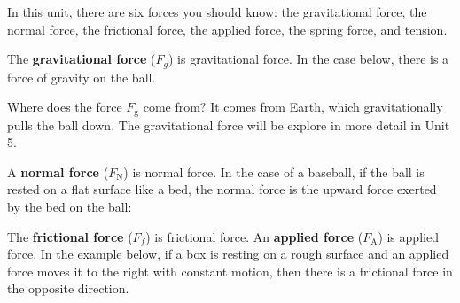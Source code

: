 \documentclass[dvipsnames]{article}
\begin{document}
\begin{center}
\end{center}

In this unit, there are six forces you should know: the gravitational force, the normal force, the frictional force, the applied force, the spring force, and tension.


The \textbf{\gls{gravitational force}} ($F_g$) is \glsdesc{gravitational force}. In the case below, there is a force of gravity on the ball. 

\begin{center}
\end{center}

Where does the force $F_\mathrm{g}$ come from? It comes from Earth, which gravitationally pulls the ball down. The gravitational force will be explore in more detail in Unit 5.

A \textbf{\gls{normal force}} ($F_\text{N}$) is \glsdesc{normal force}. In the case of a baseball, if the ball is rested on a flat surface like a bed, the normal force is the upward force exerted by the bed on the ball:

\begin{center}
\end{center}


The \textbf{\gls{frictional force}} ($F_f$) is \glsdesc{frictional force}. An \textbf{\gls{applied force}} ($F_\mathrm{A}$) is \glsdesc{applied force}. In the example below, if a box is resting on a rough surface and an applied force moves it to the right with constant motion, then there is a frictional force in the opposite direction.
\end{document}
